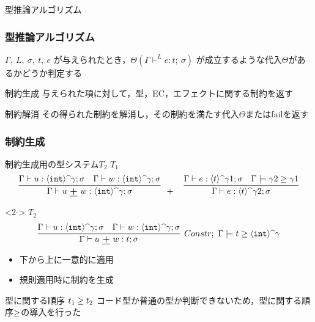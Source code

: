 \begin{frame}
  \center
  \huge{型推論アルゴリズム}
\end{frame}

\begin{frame}
  \frametitle{型推論アルゴリズム}

  $\Gamma,~ L,~ \sigma,~ t,~ e$ が与えられたとき，$\Theta(\Gamma \vdash^{L} e : t ;~\sigma)$ が成立するような代入$\Theta$があるかどうか判定する

  \begin{exampleblock}{制約生成}
    与えられた項に対して，型，EC，エフェクトに関する制約を返す
  \end{exampleblock}
  \begin{exampleblock}{制約解消}
    その得られた制約を解消し，その制約を満たす代入$\Theta$またはfailを返す
  \end{exampleblock}
\end{frame}



\begin{frame}
  \frametitle{制約生成}
  \begin{exampleblock}{制約生成用の型システム$T_2$}
    \footnotesize
    $T_1$
    \vspace{-0.5zh}
    \[
      \infer[]
      {\Gamma \vdash u~ \cPlus~ w: \codeTs{\intT}{\gamma}; \sigma}
      {\Gamma \vdash u: \codeTs{\intT}{\gamma}; \sigma & \Gamma \vdash w: \codeTs{\intT}{\gamma}; \sigma}
      +
      \quad
      \infer
      {\Gamma \vdash e : \codeTs{t}{\gamma2} ; \sigma}
      {\Gamma \vdash e : \codeTs{t}{\gamma1} ; \sigma
        & \Gamma \models \gamma2 \ord \gamma1
      }
    \]
    \vspace{-2zh}
    \begin{visibleenv}<2->
      $T_2$\\
      \[
        \infer[Constr;~ \Gamma \models \longer{t}{\codeTs{\intT}{\gamma}}]
        {\Gamma \vdash u~ \cPlus~ w: t; \sigma}
        {\Gamma \vdash u: \codeTs{\intT}{\gamma}; \sigma & \Gamma \vdash w: \codeTs{\intT}{\gamma}; \sigma}
      \]
    \end{visibleenv}
    \vspace{-2zh}
    \begin{itemize}
    \item 下から上に一意的に適用
    \item 規則適用時に制約を生成
    \end{itemize}
  \end{exampleblock}
  \begin{exampleblock}{型に関する順序 ${t_1} \ge {t_2}$}
    コード型か普通の型か判断できないため，型に関する順序$\ge$の導入を行った
  \end{exampleblock}
\end{frame}


